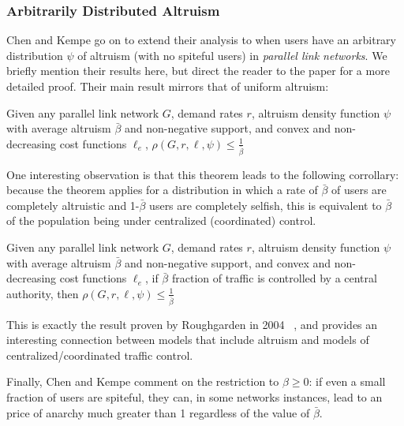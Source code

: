 \subsubsection{Arbitrarily Distributed Altruism}
Chen and Kempe go on to extend their analysis to when users have an arbitrary distribution $\psi$ of altruism (with no spiteful users) in \emph{parallel link networks}. 
We briefly mention their results here, but direct the reader to the paper for a more detailed proof.
Their main result mirrors that of uniform altruism:
\begin{theorem}
Given any parallel link network $G$, demand rates $r$, altruism density function $\psi$ with average altruism $\bar{\beta}$ and non-negative support, and convex and non-decreasing cost functions $\ell_e$,
   $\rho(G,r,\ell,\psi) \le \frac{1}{\bar{\beta}}$
\end{theorem}
One interesting observation is that this theorem leads to the following corrollary: because the theorem applies for a distribution in which a rate of $\bar{\beta}$ of users are completely altruistic and 1-$\bar{\beta}$ users are completely selfish, this is equivalent to $\bar{\beta}$ of the population being under centralized (coordinated) control. 
\begin{corollary}
Given any parallel link network $G$, demand rates $r$, altruism density function $\psi$ with average altruism $\bar{\beta}$ and non-negative support, and convex and non-decreasing cost functions $\ell_e$,
if $\bar{\beta}$ fraction of traffic is controlled by a central authority, then
   $\rho(G,r,\ell,\psi) \le \frac{1}{\bar{\beta}}$
\end{corollary}
This is exactly the result proven by Roughgarden in 2004~\cite{roughgarden04} , and provides an interesting connection between models that include altruism and models of centralized/coordinated traffic control.

Finally, Chen and Kempe comment on the restriction to $\beta \ge 0$: if even a small fraction of users are spiteful, they can, in some networks instances, lead to an price of anarchy much greater than 1 regardless of the value of $\bar{\beta}$.
